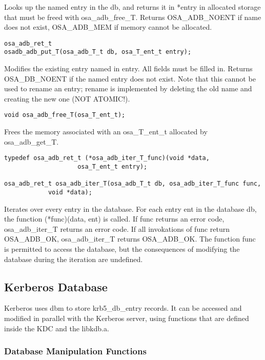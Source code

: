 Looks up the named entry in the db, and returns it in *entry in
allocated storage that must be freed with osa_adb_free_T.  Returns
OSA_ADB_NOENT if name does not exist, OSA_ADB_MEM if memory cannot be
allocated.

\begin{verbatim}
osa_adb_ret_t
osadb_adb_put_T(osa_adb_T_t db, osa_T_ent_t entry);
\end{verbatim}

Modifies the existing entry named in entry.  All fields must be filled
in.  Returns OSA_DB_NOENT if the named entry does not exist.  Note
that this cannot be used to rename an entry; rename is implemented by
deleting the old name and creating the new one (NOT ATOMIC!).

\begin{verbatim}
void osa_adb_free_T(osa_T_ent_t);
\end{verbatim}

Frees the memory associated with an osa_T_ent_t allocated by
osa_adb_get_T.

\begin{verbatim}
typedef osa_adb_ret_t (*osa_adb_iter_T_func)(void *data,
				    osa_T_ent_t entry);

osa_adb_ret_t osa_adb_iter_T(osa_adb_T_t db, osa_adb_iter_T_func func, 
		    void *data);
\end{verbatim}

Iterates over every entry in the database.  For each entry ent in the
database db, the function (*func)(data, ent) is called.  If func
returns an error code, osa_adb_iter_T returns an error code.  If all
invokations of func return OSA_ADB_OK, osa_adb_iter_T returns
OSA_ADB_OK.  The function func is permitted to access the database,
but the consequences of modifying the database during the iteration
are undefined.

\subsection{Kerberos Database}

Kerberos uses dbm to store krb5_db_entry records.  It can be accessed
and modified in parallel with the Kerberos server, using functions
that are defined inside the KDC and the libkdb.a.

\subsubsection{Database Manipulation Functions}


